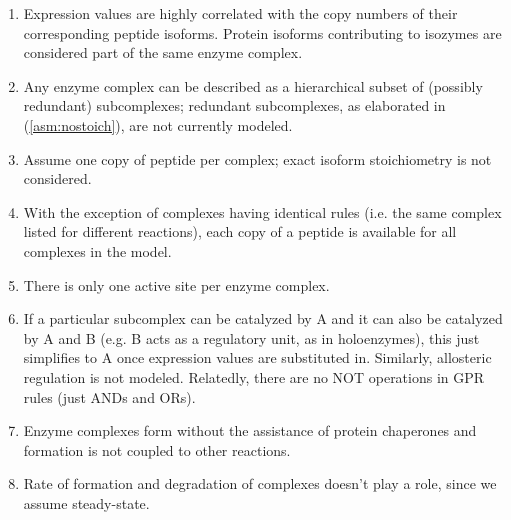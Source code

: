 

\begin{enumerate}
\item \label{asm:expcorr}
Expression values are highly correlated with the copy numbers of their
corresponding peptide isoforms.
 {}  \label{asm:isozyme} 
Protein isoforms contributing to isozymes are considered part of the
same enzyme complex.
\item \label{asm:hierarchy}
Any enzyme complex can be described as a hierarchical subset of
(possibly redundant) subcomplexes; redundant subcomplexes, as
elaborated in (\ref{asm:nostoich}), are not currently modeled.
\item \label{asm:nostoich} 
Assume one copy of peptide per complex; exact isoform stoichiometry
is not considered.
\item \label{asm:sharing} 
With the exception of complexes having identical rules (i.e. the same
complex listed for different reactions), each copy of a peptide
is available for all complexes in the model.
\item \label{asm:active_site}
There is only one active site per enzyme complex.
\item  \label{asm:holo} 
If a particular subcomplex can be catalyzed by A and it can also be
catalyzed by A and B (e.g. B acts as a regulatory unit, as in
holoenzymes), this just simplifies to A once expression values are
substituted in. Similarly, allosteric regulation is not
modeled. Relatedly, there are no NOT operations in GPR rules (just ANDs
and ORs).
\item \label{asm:chap} 
Enzyme complexes form without the assistance of protein chaperones and
formation is not coupled to other reactions.  
\item  \label{asm:rate} 
Rate of formation and degradation of complexes doesn't play a role,
since we assume steady-state. 
\end{enumerate}

